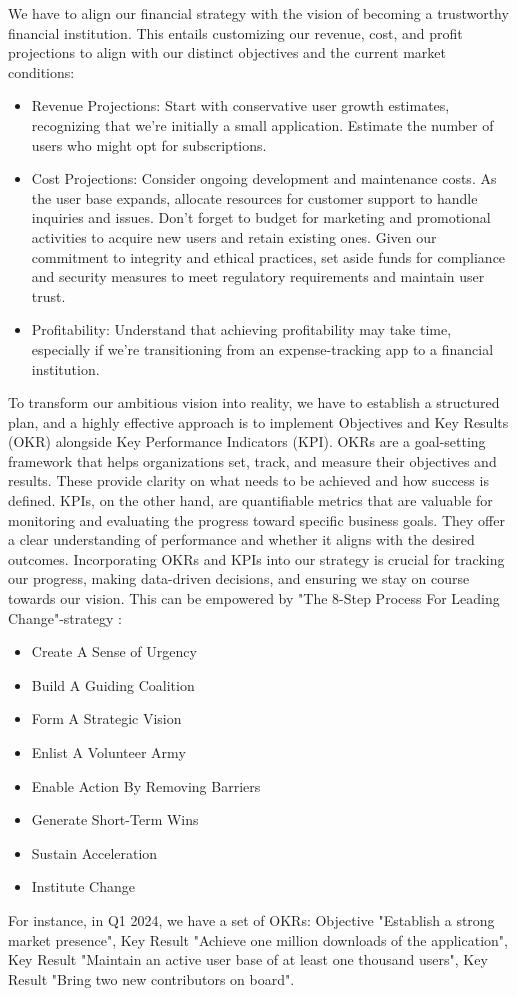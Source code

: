 We have to align our financial strategy with the vision of becoming a trustworthy financial institution. This entails 
customizing our revenue, cost, and profit projections to align with our distinct objectives and the current market 
conditions:

\begin{itemize}
  \item Revenue Projections: Start with conservative user growth estimates, recognizing that we're initially a small 
  application. Estimate the number of users who might opt for subscriptions.

  \item Cost Projections: Consider ongoing development and maintenance costs. As the user base expands, allocate 
  resources for customer support to handle inquiries and issues. Don't forget to budget for marketing and promotional 
  activities to acquire new users and retain existing ones. Given our commitment to integrity and ethical practices, 
  set aside funds for compliance and security measures to meet regulatory requirements and maintain user trust.

  \item Profitability: Understand that achieving profitability may take time, especially if we're transitioning from an 
  expense-tracking app to a financial institution.
\end{itemize}

\noindent To transform our ambitious vision into reality, we have to establish a structured plan, and a highly effective 
approach is to implement Objectives and Key Results (OKR) alongside Key Performance Indicators (KPI). OKRs are a 
goal-setting framework \cite{Doer18} that helps organizations set, track, and measure their objectives and results. 
These provide clarity on what needs to be achieved and how success is defined. KPIs, on the other hand, are quantifiable 
metrics \cite{Marr12} that are valuable for monitoring and evaluating the progress toward specific business goals. They 
offer a clear understanding of performance and whether it aligns with the desired outcomes. Incorporating OKRs and KPIs 
into our strategy is crucial for tracking our progress, making data-driven decisions, and ensuring we stay on course 
towards our vision. This can be empowered by "The 8-Step Process For Leading Change"-strategy \cite{Kott12}:

\begin{itemize}
  \item Create A Sense of Urgency
  \item Build A Guiding Coalition
  \item Form A Strategic Vision
  \item Enlist A Volunteer Army
  \item Enable Action By Removing Barriers
  \item Generate Short-Term Wins
  \item Sustain Acceleration
  \item Institute Change
\end{itemize}

\noindent For instance, in Q1 2024, we have a set of OKRs: Objective "Establish a strong market presence", Key Result 
"Achieve one million downloads of the application", Key Result "Maintain an active user base of at least one thousand 
users", Key Result "Bring two new contributors on board".

